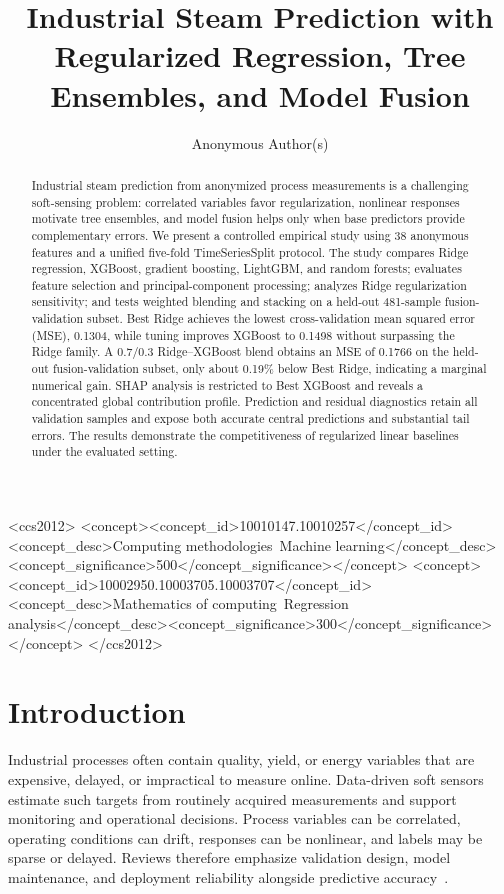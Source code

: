\documentclass[sigconf,screen,review,anonymous]{acmart}
\title{Industrial Steam Prediction with Regularized Regression, Tree Ensembles, and Model Fusion}
\author{Anonymous Author(s)}
\begin{document}
\begin{abstract}
Industrial steam prediction from anonymized process measurements is a challenging soft-sensing problem: correlated variables favor regularization, nonlinear responses motivate tree ensembles, and model fusion helps only when base predictors provide complementary errors. We present a controlled empirical study using 38 anonymous features and a unified five-fold TimeSeriesSplit protocol. The study compares Ridge regression, XGBoost, gradient boosting, LightGBM, and random forests; evaluates feature selection and principal-component processing; analyzes Ridge regularization sensitivity; and tests weighted blending and stacking on a held-out 481-sample fusion-validation subset. Best Ridge achieves the lowest cross-validation mean squared error (MSE), 0.1304, while tuning improves XGBoost to 0.1498 without surpassing the Ridge family. A 0.7/0.3 Ridge--XGBoost blend obtains an MSE of 0.1766 on the held-out fusion-validation subset, only about 0.19\% below Best Ridge, indicating a marginal numerical gain. SHAP analysis is restricted to Best XGBoost and reveals a concentrated global contribution profile. Prediction and residual diagnostics retain all validation samples and expose both accurate central predictions and substantial tail errors. The results demonstrate the competitiveness of regularized linear baselines under the evaluated setting.
\end{abstract}

\begin{CCSXML}
<ccs2012>
 <concept><concept_id>10010147.10010257</concept_id><concept_desc>Computing methodologies~Machine learning</concept_desc><concept_significance>500</concept_significance></concept>
 <concept><concept_id>10002950.10003705.10003707</concept_id><concept_desc>Mathematics of computing~Regression analysis</concept_desc><concept_significance>300</concept_significance></concept>
</ccs2012>
\end{CCSXML}

\maketitle

\section{Introduction}
Industrial processes often contain quality, yield, or energy variables that are expensive, delayed, or impractical to measure online. Data-driven soft sensors estimate such targets from routinely acquired measurements and support monitoring and operational decisions. Process variables can be correlated, operating conditions can drift, responses can be nonlinear, and labels may be sparse or delayed. Reviews therefore emphasize validation design, model maintenance, and deployment reliability alongside predictive accuracy~\cite{kadlec2009softsensor,yeo2023jit,sheng2024review,perera2023ai_softsensor}.
\end{document}

